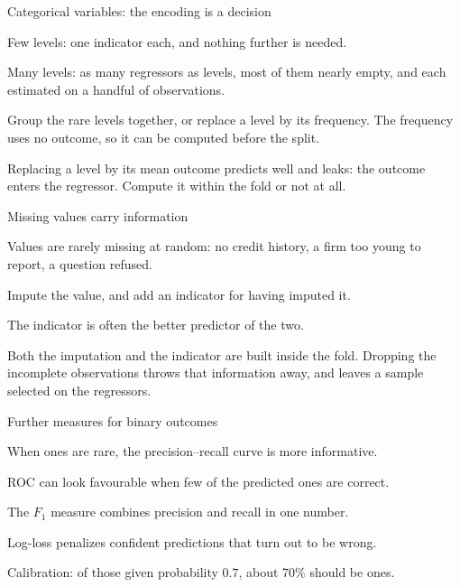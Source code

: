 \documentclass[aspectratio=169,11pt]{beamer}
\newenvironment{wideitemize}{\itemize\addtolength{\itemsep}{9pt}}{\enditemize}
\newcommand{\closingline}[1]{\vspace{0.9em}\noindent #1}
\begin{document}
\begin{frame}{Categorical variables: the encoding is a decision}
\begin{wideitemize}
  \item Few levels: one indicator each, and nothing further is needed.
  \item Many levels: as many regressors as levels, most of them nearly empty,
        and each estimated on a handful of observations.
  \item Group the rare levels together, or replace a level by its frequency.
        The frequency uses no outcome, so it can be computed before the split.
  \item Replacing a level by its mean outcome predicts well and leaks: the
        outcome enters the regressor. Compute it within the fold or not at all.
\end{wideitemize}
\end{frame}

\begin{frame}{Missing values carry information}
\begin{wideitemize}
  \item Values are rarely missing at random: no credit history, a firm too
        young to report, a question refused.
  \item Impute the value, and add an indicator for having imputed it.
  \item The indicator is often the better predictor of the two.
  \item Both the imputation and the indicator are built inside the fold.
\end{wideitemize}
\closingline{Dropping the incomplete observations throws that information away,
and leaves a sample selected on the regressors.}
\end{frame}

\begin{frame}{Further measures for binary outcomes}
\begin{wideitemize}
  \item When ones are rare, the precision--recall curve is more informative.
  \item ROC can look favourable when few of the predicted ones are correct.
  \item The $F_1$ measure combines precision and recall in one number.
  \item Log-loss penalizes confident predictions that turn out to be wrong.
  \item Calibration: of those given probability $0.7$, about 70\% should be ones.
\end{wideitemize}
\end{frame}
\end{document}
